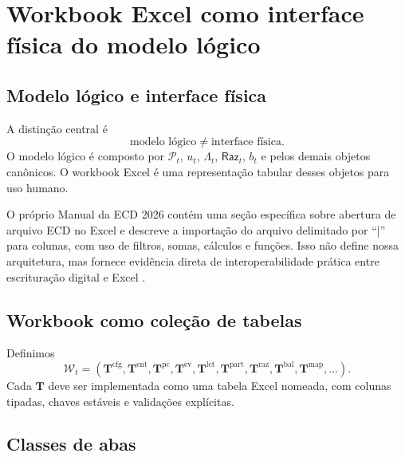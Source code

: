 \documentclass[11pt,a4paper]{article}
\newcommand{\Plano}{\mathcal{P}}
\newcommand{\Raz}{\mathsf{Raz}}
\newcommand{\Wb}{\mathcal{W}}
\begin{document}
\section{Workbook Excel como interface física do modelo lógico}

\subsection{Modelo lógico e interface física}

A distinção central é
\begin{equation}
\boxed{
\text{modelo lógico}
\neq
\text{interface física}.
}
\end{equation}
O modelo lógico é composto por $\Plano_t$, $u_t$, $\Lambda_t$, $\Raz_t$, $b_t$ e pelos demais objetos canônicos. O workbook Excel é uma representação tabular desses objetos para uso humano.

\begin{fonte}
O próprio Manual da ECD 2026 contém uma seção específica sobre abertura de arquivo ECD no Excel e descreve a importação do arquivo delimitado por ``|'' para colunas, com uso de filtros, somas, cálculos e funções. Isso não define nossa arquitetura, mas fornece evidência direta de interoperabilidade prática entre escrituração digital e Excel \cite{ECD2026}.
\end{fonte}

\subsection{Workbook como coleção de tabelas}

Definimos
\begin{equation}
\boxed{
\Wb_t=
(\mathbf T^{\mathrm{cfg}},\mathbf T^{\mathrm{ent}},\mathbf T^{\mathrm{pc}},
\mathbf T^{\mathrm{ev}},\mathbf T^{\mathrm{lct}},\mathbf T^{\mathrm{part}},
\mathbf T^{\mathrm{raz}},\mathbf T^{\mathrm{bal}},\mathbf T^{\mathrm{map}},\ldots).
}
\label{eq:workbook}
\end{equation}
Cada $\mathbf T$ deve ser implementada como uma tabela Excel nomeada, com colunas tipadas, chaves estáveis e validações explícitas.

\subsection{Classes de abas}
\end{document}

